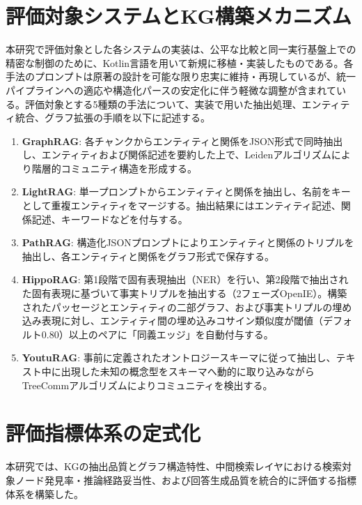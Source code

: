 \documentclass[a4j,dvipdfmx]{jsarticle}
\begin{document}
\section{評価対象システムとKG構築メカニズム}

本研究で評価対象とした各システムの実装は、公平な比較と同一実行基盤上での精密な制御のために、Kotlin言語を用いて新規に移植・実装したものである。各手法のプロンプトは原著の設計を可能な限り忠実に維持・再現しているが、統一パイプラインへの適応や構造化パースの安定化に伴う軽微な調整が含まれている。評価対象とする5種類の手法について、実装で用いた抽出処理、エンティティ統合、グラフ拡張の手順を以下に記述する。
\begin{enumerate}
    \item \textbf{GraphRAG}: 各チャンクからエンティティと関係をJSON形式で同時抽出し、エンティティおよび関係記述を要約した上で、Leidenアルゴリズムにより階層的コミュニティ構造を形成する。
    \item \textbf{LightRAG}: 単一プロンプトからエンティティと関係を抽出し、名前をキーとして重複エンティティをマージする。抽出結果にはエンティティ記述、関係記述、キーワードなどを付与する。
    \item \textbf{PathRAG}: 構造化JSONプロンプトによりエンティティと関係のトリプルを抽出し、各エンティティと関係をグラフ形式で保存する。
    \item \textbf{HippoRAG}: 第1段階で固有表現抽出（NER）を行い、第2段階で抽出された固有表現に基づいて事実トリプルを抽出する（2フェーズOpenIE）。構築されたパッセージとエンティティの二部グラフ、および事実トリプルの埋め込み表現に対し、エンティティ間の埋め込みコサイン類似度が閾値（デフォルト0.80）以上のペアに「同義エッジ」を自動付与する。
    \item \textbf{YoutuRAG}: 事前に定義されたオントロジースキーマに従って抽出し、テキスト中に出現した未知の概念型をスキーマへ動的に取り込みながらTreeCommアルゴリズムによりコミュニティを検出する。
\end{enumerate}

\section{評価指標体系の定式化}

本研究では、KGの抽出品質とグラフ構造特性、中間検索レイヤにおける検索対象ノード発見率・推論経路妥当性、および回答生成品質を統合的に評価する指標体系を構築した。
\end{document}
